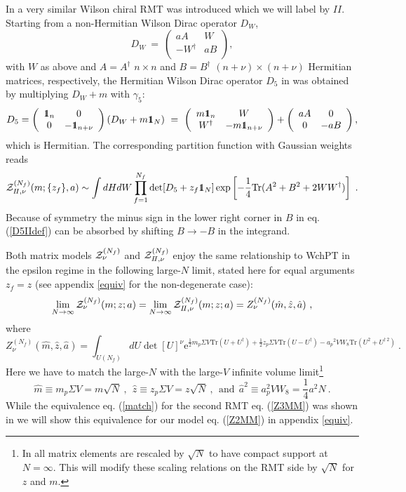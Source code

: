 \documentclass[11pt]{article}
\newcommand{\be}{\begin{equation}}
\newcommand{\ee}{\end{equation}}
\newcommand{\eins}{\leavevmode\hbox{\small1\kern-3.8pt\normalsize1}}
\newcommand{\e}{\mbox{e}}
\newcommand{\ha}{\hat{a}}
\def\Tr{{\mbox{Tr}}}
\begin{document}
In \cite{DSV} a very similar Wilson chiral RMT was introduced which we will
label by $I\!I$. Starting from a non-Hermitian Wilson Dirac operator $D_W$,
\be
D_W\ =\
\left(\begin{array}{cc}
aA& W\\
-W^\dag&aB\\
\end{array}\right),
\ee
with $W$ as above and $A=A^\dag$ $n\times n$ and $B=B^\dag$
$(n+\nu)\times(n+\nu)$ Hermitian matrices, respectively,
the Hermitian Wilson Dirac operator $D_5$ in \cite{DSV}
was obtained by multiplying $D_W+m$ with $\gamma_5$:
\be
D_5=\left(\begin{array}{cc}
\eins_n& 0\\
0&-\eins_{n+\nu}\\
\end{array}\right)(D_W+m\eins_N)\ =\
\left(\begin{array}{cc}
m\eins_{n}& W\\
W^\dag&-m\eins_{n+\nu}\\
\end{array}\right)
+\left(\begin{array}{cc}
aA& 0\\
0&-aB\\
\end{array}\right),
\label{D5IIdef}
\ee
which is Hermitian. The corresponding partition function with Gaussian
weights reads
\be
{\cal Z}_{I\!I,\nu}^{(N_f)}(m;\{z_f\},a)\sim
\int dH dW \prod_{f=1}^{N_f}
\det[D_5
+z_f\eins_N]\exp\left[-\frac{1}{4}\Tr(A^2+B^2+2WW^\dag)\right]\ .
\label{Z3MM}
\ee
Because of symmetry the minus sign in the lower right corner in $B$ in
eq. (\ref{D5IIdef}) can be
absorbed by shifting $B\to-B$ in the integrand.

Both matrix models ${\cal Z}_{\nu}^{(N_f)}$ and ${\cal
  Z}_{I\!I,\nu}^{(N_f)}$  enjoy the same 
relationship to WchPT in the epsilon regime
in the following large-$N$ limit, stated here for equal arguments
$z_f=z$ (see appendix \ref{equiv} for the non-degenerate case): 
\be
\lim_{N\to\infty} {\cal Z}_{\nu}^{(N_f)}(m;z;a)=
\lim_{N\to\infty} {\cal Z}_{I\!I,\nu}^{(N_f)}(m;z;a)=
Z_\nu^{(N_f)}(\hat m,\hat z,\ha)\ ,
\label{match}
\ee
where
\be
Z_\nu^{(N_f)}(\hat m,\hat z,\hat a)=
\int_{U(N_f)} dU \det[U]^\nu \e^{\frac12 m_p \Sigma V\Tr(U+U^\dag)
+\frac12 z_p \Sigma V\Tr(U-U^\dag)
-{a_p}^2VW_8\Tr(U^2+U^{\dag\,2})}\ .
\label{eWchPT}
\ee
Here we have to match the large-$N$ with the large-$V$ infinite volume
limit\footnote{In \cite{DSV,ADSV} all matrix elements are rescaled by
  $\sqrt{N}$ to have compact support at $N=\infty$. This will modify
  these scaling relations on the RMT side by $\sqrt{N}$ for $z$ and $m$.}
\be
\hat m \equiv m_p\Sigma V= m\sqrt{N}\ ,\ \ \hat z\equiv z_p \Sigma V=
z\sqrt{N}\ ,
\ \ \mbox{and}\ \
\hat{a}^2\equiv a_p^2VW_8=\frac14 a^2 N\ .
\label{mza-rel}
\ee
While the equivalence eq. (\ref{match}) for the second RMT
eq. (\ref{Z3MM}) was shown in 
\cite{DSV} we will show this equivalence for our model
eq. (\ref{Z2MM}) in appendix \ref{equiv}.
\end{document}
